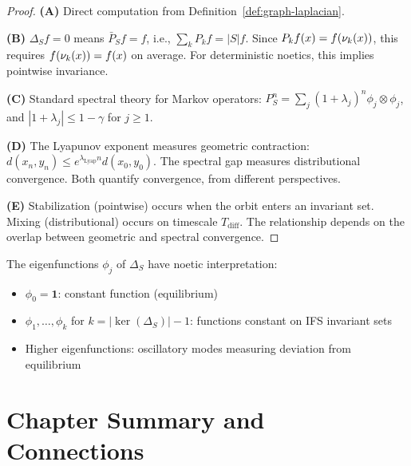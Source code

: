 \begin{proof}
\textbf{(A)} Direct computation from Definition~\ref{def:graph-laplacian}.

\textbf{(B)} $\Delta_S f = 0$ means $\bar{P}_S f = f$, i.e., $\sum_k P_k f = |S| f$. Since $P_k f(x) = f(\nu_{k}(x))$, this requires $f(\nu_{k}(x)) = f(x)$ on average. For deterministic noetics, this implies pointwise invariance.

\textbf{(C)} Standard spectral theory for Markov operators: $P_S^n = \sum_j (1 + \lambda_j)^n \phi_j \otimes \phi_j$, and $|1 + \lambda_j| \leq 1 - \gamma$ for $j \geq 1$.

\textbf{(D)} The Lyapunov exponent measures geometric contraction: $d(x_n, y_n) \leq e^{\lambda_{\mathrm{Lyap}} n} d(x_0, y_0)$. The spectral gap measures distributional convergence. Both quantify convergence, from different perspectives.

\textbf{(E)} Stabilization (pointwise) occurs when the orbit enters an invariant set. Mixing (distributional) occurs on timescale $T_{\mathrm{diff}}$. The relationship depends on the overlap between geometric and spectral convergence.
\end{proof}

\begin{corollary}
\label{cor:eigenfunction-interpretation}
The eigenfunctions $\phi_j$ of $\Delta_S$ have noetic interpretation:
\begin{itemize}
  \item $\phi_0 = \mathbf{1}$: constant function (equilibrium)
  \item $\phi_1, \ldots, \phi_k$ for $k = |\ker(\Delta_S)| - 1$: functions constant on IFS invariant sets
  \item Higher eigenfunctions: oscillatory modes measuring deviation from equilibrium
\end{itemize}
\end{corollary}

\section{Chapter Summary and Connections}
\label{sec:ch6-summary}

